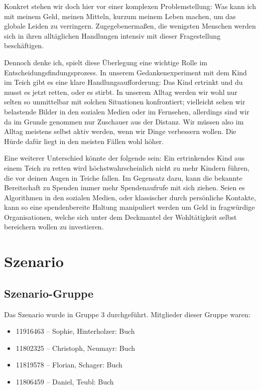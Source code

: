 \documentclass[twoside, a4paper, DIV=11, open=any, bibliography=totoc]{scrbook}
\begin{document}
Konkret stehen wir doch hier vor einer komplexen Problemstellung:
Was kann ich mit meinem Geld, meinen Mitteln, kurzum meinem Leben machen,
um das globale Leiden zu verringern.
Zugegebenermaßen, die wenigsten Menschen werden sich in ihren alltäglichen Handlungen
intensiv mit dieser Fragestellung beschäftigen.

Dennoch denke ich, spielt diese Überlegung eine wichtige Rolle im Entscheidungsfindungsprozess.
In unserem Gedankenexperiment mit dem Kind im Teich gibt es eine klare Handlungsaufforderung:
Das Kind ertrinkt und du musst es jetzt retten, oder es stirbt.
In unserem Alltag werden wir wohl nur selten so unmittelbar mit solchen Situationen konfrontiert;
vielleicht sehen wir belastende Bilder in den sozialen Medien oder im Fernsehen,
allerdings sind wir da im Grunde genommen nur Zuschauer aus der Distanz.
Wir müssen also im Alltag meistens selbst aktiv werden, wenn wir Dinge verbessern
wollen. Die Hürde dafür liegt in den meisten Fällen wohl höher.

Eine weiterer Unterschied könnte der folgende sein: Ein ertrinkendes Kind aus
einem Teich zu retten wird höchstwahrscheinlich nicht zu mehr Kindern führen,
die vor deinen Augen in Teiche fallen. Im Gegensatz dazu, kann die bekannte
Bereitschaft zu Spenden immer mehr Spendenaufrufe mit sich ziehen.
Seien es Algorithmen in den sozialen Medien, oder klassischer durch persönliche
Kontakte, kann so eine spendenbereite Haltung manipuliert werden um Geld in
fragwürdige Organisationen, welche sich unter dem Deckmantel der Wohltätigkeit
selbst bereichern wollen zu investieren.

\chapter{Szenario} \label{chap:szenario}

\section{Szenario-Gruppe} \label{sec:szengruppe}

Das Szenario wurde in Gruppe 3 durchgeführt. Mitglieder dieser Gruppe waren:

\begin{itemize}
    \item 11916463 – Sophie, Hinterholzer: Buch
    \item 11802325 – Christoph, Neumayr: Buch
    \item 11819578 – Florian, Schager: Buch
    \item 11806459 – Daniel, Teubl: Buch
\end{itemize}
\end{document}
